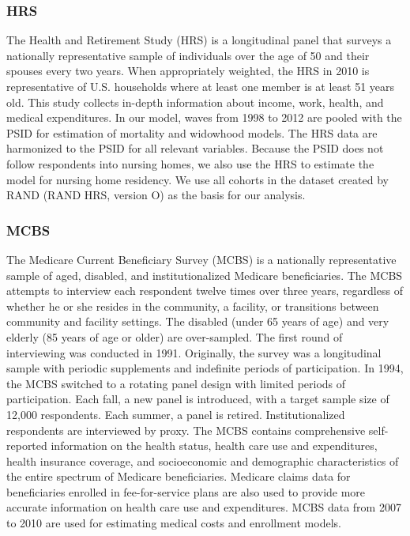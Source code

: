 \subsubsection{HRS}

\noindent The Health and Retirement Study (HRS) is a longitudinal panel that surveys a nationally representative sample of individuals over the age of 50 and their spouses every two years. When appropriately weighted, the HRS in 2010 is representative of U.S. households
where at least one member is at least 51 years old.
This study collects in-depth information about income, work, health, and medical expenditures. In our model, waves from 1998 to 2012 are pooled with the PSID for estimation of mortality and
widowhood models. The HRS data
are harmonized to the PSID for all relevant variables. Because the PSID does not follow respondents into nursing homes, we also use the HRS to estimate the model for nursing home residency. We use all cohorts in the dataset created by RAND (RAND HRS, version O) as the basis
for our analysis.

\subsubsection{MCBS}
\noindent The Medicare Current Beneficiary Survey (MCBS) is a nationally representative sample of aged, disabled,
and institutionalized Medicare beneficiaries. The MCBS attempts to interview each respondent twelve
times over three years, regardless of whether he or she resides in the community, a facility, or
transitions between community and facility settings. The disabled (under 65 years of age) and
very elderly (85 years of age or older) are over-sampled. The first round of interviewing was conducted
in 1991. Originally, the survey was a longitudinal sample with periodic supplements and indefinite
periods of participation. In 1994, the MCBS switched to a rotating panel design with limited periods
of participation. Each fall, a new panel is introduced, with a target sample size of 12,000 respondents. Each summer, a panel is retired. Institutionalized respondents are interviewed by proxy. The MCBS
contains comprehensive self-reported information on the health status, health care use and
expenditures, health insurance coverage, and socioeconomic and demographic characteristics of the
entire spectrum of Medicare beneficiaries. Medicare claims data for beneficiaries enrolled in
fee-for-service plans are also used to provide more accurate information on health care use and
expenditures. MCBS data from 2007 to 2010 are used for estimating medical costs and enrollment models.

